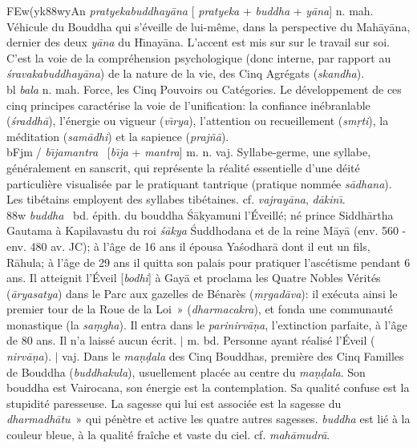 \documentclass[a4paper,11pt,twocolumn]{article}
\begin{document}

{\dn \3FEw(y\?k\388wyAn} {\em pratyekabuddhay\={a}na} [{\em
pratyeka} + {\em buddha} + {\em y\={a}na}] n. mah. \og Véhicule du
Bouddha qui s'éveille de lui-même\fg, dans la perspective du
Mah\={a}y\={a}na, dernier des deux {\em y\={a}na} du
H\={\i}nay\={a}na. L'accent est mis sur sur le travail sur soi. C'est
la voie de la compréhension psychologique (donc interne, par rapport
au {\em \'{s}ravakabuddhay\={a}na}) de la nature de la vie, des Cinq
Agrégats ({\em skandha}). \\

{\dn bl} {\em bala} n. mah. \og Force\fg, les Cinq Pouvoirs ou
Catégories. Le développement de ces cinq principes caractérise la voie
de l'unification: la confiance inébranlable ({\em \'{s}raddh\={a}}),
l'énergie ou vigueur ({\em v\={\i}rya}), l'attention ou recueillement
({\em sm\d{r}ti}), la méditation ({\em sam\={a}dhi}) et la sapience
({\em prajñ\={a}}). \\

{\dn bFjm^^F/} {\em b\={\i}jamantra} \ [{\em b\={\i}ja} +
{\em mantra}] m. n. vaj. \og Syllabe-germe\fg, une syllabe, généralement
en sanscrit, qui représente la réalité essentielle d'une déité
particulière visualisée par le pratiquant tantrique (pratique nommée
{\em s\={a}dhana}). Les tibétains employent des syllabes
tibétaines. cf. {\em vajray\={a}na}, {\em d\={a}kin\={\i}}. \\

{\dn {}\388w} {\em buddha} \ bd. épith. du bouddha \'{S}\={a}kyamuni
\og l'Éveillé\fg; né prince Siddh\={a}rtha Gautama à Kapilavastu du roi
{\em \'{s}\={a}kya} \'{S}uddhodana et de la reine M\={a}y\={a}
(env. 560 - env. 480 av. JC); à l'âge de 16 ans il épousa
Ya\'{s}odhar\={a} dont il eut un fils, R\={a}hula; à l'âge de 29 ans
il quitta son palais pour pratiquer l'ascétisme pendant 6 ans. Il
atteignit l'Éveil [{\em bodhi}] à Gay\={a} et proclama les Quatre
Nobles Vérités ({\em \={a}ryasatya}) dans le Parc aux gazelles de
Bénarès ({\em m\d{r}gad\={a}va}): il exécuta ainsi \og le premier tour
de la Roue de la Loi~» ({\em dharmacakra}), et fonda une communauté
monastique (la {\em sa\d{m}gha}). Il entra dans le  {\em
parinirv\={a}\d{n}a}, l'extinction parfaite, à l'âge de 80 ans. Il n'a
laissé aucun écrit. $\mid$ m. bd. Personne ayant réalisé l'Éveil ({\em
nirv\={a}\d{n}a}). $\mid$ vaj. Dans le {\em ma\d{n}\d{d}ala} des Cinq
Bouddhas, première des Cinq Familles de Bouddha ({\em buddhakula}),
usuellement  placée au centre du {\em ma\d{n}\d{d}ala}. Son bouddha
est Vairocana, son énergie est la contemplation. Sa qualité confuse
est  la stupidité paresseuse. La sagesse qui lui est associée est \og
la sagesse du  {\em dharmadh\={a}tu}~» qui pénètre et active les
quatre autres sagesses. {\em buddha} est lié à la couleur bleue, à la
qualité fraîche et vaste du ciel. cf. {\em mah\={a}mudr\={a}}.\\
\end{document}

